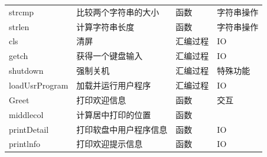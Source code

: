 \documentclass[a4paper, 11pt]{article} %
\begin{document}
\begin{table}[]
\begin{tabular}{llll}
  {\color[HTML]{000000} strcmp}                                & {\color[HTML]{000000} 比较两个字符串的大小}                                  & {\color[HTML]{000000} 函数}                                & {\color[HTML]{000000} 字符串操作} \\
  {\color[HTML]{000000} strlen}                                & {\color[HTML]{000000} 计算字符串长度}                                     & {\color[HTML]{000000} 函数}                                & {\color[HTML]{000000} 字符串操作} \\
  {\color[HTML]{000000} cls}                                   & {\color[HTML]{000000} 清屏}                                          & {\color[HTML]{000000} 汇编过程}                                & {\color[HTML]{000000} IO}    \\
  {\color[HTML]{000000} getch}                                 & {\color[HTML]{000000} 获得一个键盘输入}                                    & {\color[HTML]{000000} 汇编过程}                                & {\color[HTML]{000000} IO}    \\
  {\color[HTML]{000000} shutdown}                              & {\color[HTML]{000000} 强制关机}                                        & {\color[HTML]{000000} 汇编过程}                                & {\color[HTML]{000000} 特殊功能}  \\
  {\color[HTML]{000000} loadUsrProgram}                        & {\color[HTML]{000000} 加载并运行用户程序}                                   & {\color[HTML]{000000} 汇编过程}                                & {\color[HTML]{000000} IO}    \\
  {\color[HTML]{000000} Greet}                                 & {\color[HTML]{000000} 打印欢迎信息}                                      & {\color[HTML]{000000} 函数}                                  & {\color[HTML]{000000} 交互}    \\
  {\color[HTML]{000000} middlecol}                             & {\color[HTML]{000000} 计算居中打印的位置}                                   & {\color[HTML]{000000} 函数}                                  & {\color[HTML]{000000} }      \\
  {\color[HTML]{000000} printDetail}                           & {\color[HTML]{000000} 打印软盘中用户程序信息}                                 & {\color[HTML]{000000} 函数}                                  & {\color[HTML]{000000} IO}    \\
  {\color[HTML]{000000} printlnfo}                             & {\color[HTML]{000000} 打印欢迎提示信息}                                    & {\color[HTML]{000000} 函数}                                  & {\color[HTML]{000000} IO}    \\

\end{tabular}
\end{table}
\end{document}
